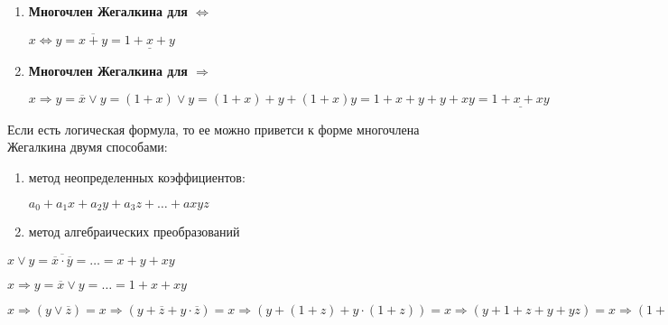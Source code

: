 \documentclass[russian]{lecture-notes}
\begin{document}
\begin{sloppypar}
\begin{enumerate}
            \item{
                \textbf{Многочлен Жегалкина для $\Leftrightarrow$}

                $x \Leftrightarrow y = \overline{x + y} = \underline{1 + x + y}$
            }

            \item{
                \textbf{Многочлен Жегалкина для $\Rightarrow$}

                $x \Rightarrow y = \overline{x} \lor y = (1 + x) \lor y = (1 + x) + y + (1 + x)y = 1 + x + y + y + xy = \underline{1 + x + xy}$
            }
        \end{enumerate}

        \begin{remark}

            Если есть логическая формула, то ее можно приветси к форме многочлена Жегалкина двумя способами:

            \begin{enumerate}
                \item{
                    метод неопределенных коэффициентов:

                    $a_0 + a_1x + a_2y + a_3z + \dots + axyz$
                }
                \item{
                    метод алгебраических преобразований
                }
            \end{enumerate}

            \begin{example}
                $x \lor y = \overline{\overline{x} \cdot \overline{y}} = \dots = x + y + xy$
            \end{example}

            \begin{example}
                $x \Rightarrow y = \overline{x} \lor y = \dots = 1 + x + xy$
            \end{example}

            \begin{example}
                $x \Rightarrow (y \lor \overline{z}) = x \Rightarrow (y + \overline{z} + y \cdot \overline{z}) = x \Rightarrow (y + (1 + z) + y \cdot (1 + z))  = x \Rightarrow (y + 1 + z + y + yz) = x \Rightarrow (1 + z + yz) = 1 + x + x(1 + z + yz) = 1 + x + x + xz + xyz = 1 + xz + xyz $
            \end{example}

        \end{remark}


\end{sloppypar}
\end{document}
